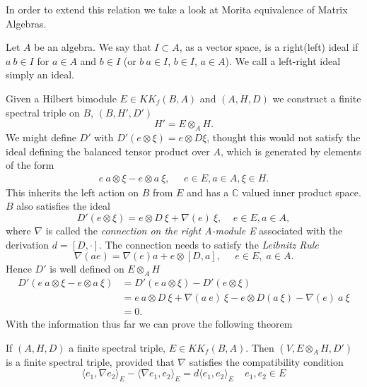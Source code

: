 In order to extend this relation we take a look at Morita equivalence of Matrix Algebras.
\begin{definition}
    Let $A$ be an algebra. We say that $I \subset A$, as a vector space, is a
    right(left) ideal if $a\ b \in I$ for $a \in A$ and $b\in I$ (or $b\ a \in
    I$, $b\in I$, $a\in A$). We call a left-right ideal simply an ideal.
\end{definition}

Given a Hilbert bimodule $E \in KK_f(B, A)$ and $(A, H, D)$ we construct
a finite spectral triple on $B$, $(B, H', D')$
\begin{equation}
    H' = E \otimes _A H.
\end{equation}
We might define $D'$ with $D'(e \otimes \xi) = e\otimes D\xi$, thought this
would not satisfy the ideal defining the balanced tensor product over $A$,
which is generated by elements of the form
\begin{align}
    e\ a \otimes \xi - e\otimes a\ \xi, \;\;\;\;\; e\in E, a\in A, \xi \in H.
\end{align}
This inherits the left action on $B$ from $E$ and has a $\mathbb{C}$
valued inner product space. $B$ also satisfies the ideal
\begin{equation}
    D'(e\otimes \xi) = e \otimes D\ \xi + \nabla (e)\ \xi, \;\;\;\; e\in
    E, a\in A,
\end{equation}
where $\nabla$ is called the \textit{connection on the right A-module E}
associated with the  derivation $d=[D, \cdot]$. The connection needs to
satisfy the \textit{Leibnitz Rule}
\begin{equation}
    \nabla(ae) = \nabla(e)a + e \otimes [D, a], \;\;\;\;\;  e\in E,\; a\in A.
\end{equation}
Hence $D'$ is well defined on $E \otimes _A H$
\begin{align}
    D'(e\ a \otimes \xi - e \otimes a\ \xi) &=  D'(e\ a \otimes \xi) - D'(e
    \otimes \xi) \nonumber\\
    &= e\ a\otimes D\ \xi + \nabla(a\ e)\ \xi - e \otimes D(a\ \xi) - \nabla
    (e)\ a\ \xi \nonumber\\
    &= 0.
\end{align}
With the information thus far we can prove the following theorem
\begin{theorem}
    If $(A, H, D)$ a finite spectral triple, $E \in KK_f(B, A)$.
    Then $(V, E\otimes _A H, D')$ is a finite spectral triple, provided that
    $\nabla$ satisfies the compatibility condition
    \begin{equation}
        \langle e_1, \nabla e_2 \rangle _E - \langle \nabla e_1, e_2
        \rangle _E = d\langle e_1, e_2 \rangle _E \;\;\;\; e_1, e_2 \in E
    \end{equation}
\end{theorem}
